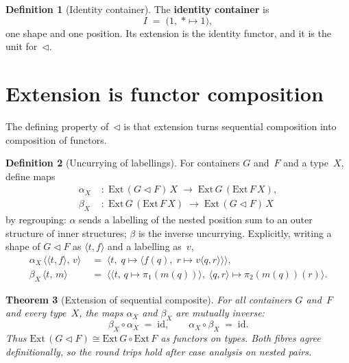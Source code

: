 \documentclass[11pt,a4paper]{article}
\theoremstyle{plain}
\newtheorem{theorem}{Theorem}[section]
\theoremstyle{definition}
\newtheorem{definition}[theorem]{Definition}
\newcommand{\Ext}{\mathrm{Ext}}
\newcommand{\id}{\mathrm{id}}
\newcommand{\seqop}{\mathbin{\triangleleft}}
\begin{document}
\begin{definition}[Identity container]\label{def:I}
The \textbf{identity container} is
\begin{equation}
  I \;=\; \bigl(1,\; {\ast} \mapsto 1\bigr),
\end{equation}
one shape and one position. Its extension is the identity functor, and
it is the unit for~$\seqop$.
\end{definition}

\section{Extension is functor composition}

The defining property of~$\seqop$ is that extension turns sequential
composition into composition of functors.

\begin{definition}[Uncurrying of labellings]\label{def:seqext}
For containers $G$ and~$F$ and a type~$X$, define maps
\begin{align}
  \alpha_X &\;:\;
  \Ext\,(G \seqop F)\,X
  \;\longrightarrow\;
  \Ext\,G\,(\Ext\,F\,X), \\[4pt]
  \beta_X &\;:\;
  \Ext\,G\,(\Ext\,F\,X)
  \;\longrightarrow\;
  \Ext\,(G \seqop F)\,X
\end{align}
by regrouping: $\alpha$ sends a labelling of the nested position sum to
an outer structure of inner structures; $\beta$ is the inverse
uncurrying. Explicitly, writing a shape of $G \seqop F$ as
$\langle t, f \rangle$ and a labelling as~$v$,
\begin{align}
  \alpha_X\,\bigl\langle \langle t, f \rangle,\, v \bigr\rangle
  &\;=\;
  \bigl\langle
    t,\;
    q \mapsto
    \bigl\langle f(q),\; r \mapsto v\langle q, r \rangle \bigr\rangle
  \bigr\rangle, \\[4pt]
  \beta_X\,\bigl\langle t,\, m \bigr\rangle
  &\;=\;
  \bigl\langle
    \langle t,\, q \mapsto \pi_1(m(q)) \rangle,\;
    \langle q, r \rangle \mapsto \pi_2(m(q))(r)
  \bigr\rangle.
\end{align}
\end{definition}

\begin{theorem}[Extension of sequential composite]
\label{thm:seq-ext}
For all containers $G$ and~$F$ and every type~$X$, the maps $\alpha_X$
and $\beta_X$ are mutually inverse:
\begin{equation}
  \beta_X \circ \alpha_X \;=\; \id,
  \qquad
  \alpha_X \circ \beta_X \;=\; \id.
\end{equation}
Thus $\Ext\,(G \seqop F) \cong \Ext\,G \circ \Ext\,F$ as functors on
types. Both fibres agree definitionally, so the round trips hold after
case analysis on nested pairs.
\end{theorem}
\end{document}
